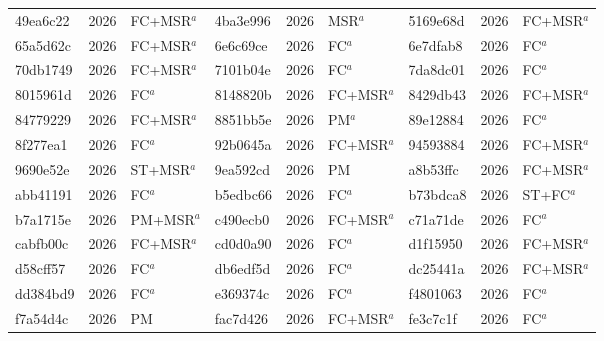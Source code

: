 \begin{longtable}{lll@{\hspace{10pt}}lll@{\hspace{10pt}}lll}
49ea6c22 & 2026 & FC+MSR$^{a}$ & 4ba3e996 & 2026 & MSR$^{a}$ & 5169e68d & 2026 & FC+MSR$^{a}$ \\
65a5d62c & 2026 & FC+MSR$^{a}$ & 6e6c69ce & 2026 & FC$^{a}$ & 6e7dfab8 & 2026 & FC$^{a}$ \\
70db1749 & 2026 & FC+MSR$^{a}$ & 7101b04e & 2026 & FC$^{a}$ & 7da8dc01 & 2026 & FC$^{a}$ \\
8015961d & 2026 & FC$^{a}$ & 8148820b & 2026 & FC+MSR$^{a}$ & 8429db43 & 2026 & FC+MSR$^{a}$ \\
84779229 & 2026 & FC+MSR$^{a}$ & 8851bb5e & 2026 & PM$^{a}$ & 89e12884 & 2026 & FC$^{a}$ \\
8f277ea1 & 2026 & FC$^{a}$ & 92b0645a & 2026 & FC+MSR$^{a}$ & 94593884 & 2026 & FC+MSR$^{a}$ \\
9690e52e & 2026 & ST+MSR$^{a}$ & 9ea592cd & 2026 & PM & a8b53ffc & 2026 & FC+MSR$^{a}$ \\
abb41191 & 2026 & FC$^{a}$ & b5edbc66 & 2026 & FC$^{a}$ & b73bdca8 & 2026 & ST+FC$^{a}$ \\
b7a1715e & 2026 & PM+MSR$^{a}$ & c490ecb0 & 2026 & FC+MSR$^{a}$ & c71a71de & 2026 & FC$^{a}$ \\
cabfb00c & 2026 & FC+MSR$^{a}$ & cd0d0a90 & 2026 & FC$^{a}$ & d1f15950 & 2026 & FC+MSR$^{a}$ \\
d58cff57 & 2026 & FC$^{a}$ & db6edf5d & 2026 & FC$^{a}$ & dc25441a & 2026 & FC+MSR$^{a}$ \\
dd384bd9 & 2026 & FC$^{a}$ & e369374c & 2026 & FC$^{a}$ & f4801063 & 2026 & FC$^{a}$ \\
f7a54d4c & 2026 & PM & fac7d426 & 2026 & FC+MSR$^{a}$ & fe3c7c1f & 2026 & FC$^{a}$ \\
\end{longtable}
